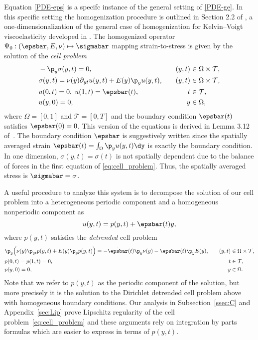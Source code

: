 \documentclass[letterpaper,11pt]{article}
\begin{document}
Equation \eqref{PDE-eps} is a specifc instance of the general setting of \eqref{PDE-ge}. In this specific setting the homogenization procedure is outlined in Section 2.2 of \cite{bhattacharya2023learning}, a one-dimensionalization of the general case of homogenization for Kelvin--Voigt viscoelasticity developed in \cite{francfort1986homogenization}. The homogenized operator $\Psi_0: (\epsbar, E, \nu) \mapsto \sigmabar$ mapping strain-to-stress is given by the solution of the \textit{cell problem}
\begin{subequations}\label{eq:cell_problem}
    \begin{align}
        &-\p_y\sigma(y, t) = 0, &\quad (y,t) &\in \Omega \times \mathcal{T}, \\
         &\sigma(y, t) = \nu(y)\partial_{yt}u(y, t) + E(y)\p_y u(y, t), &\quad (y,t) &\in \Omega \times \mathcal{T}, \label{subeq:map}\\
        &u(0, t) = 0, \; u(1, t) = \epsbar(t), &\; t &\in \mathcal{T}, \\
        &u(y, 0) = 0, &\; y&\in \Omega,
    \end{align}
\end{subequations}
where $\Omega = [0, 1]$ and $\mathcal{T} = [0, T]$ and the boundary condition $\epsbar(t)$ satisfies $\epsbar(0) = 0$. This version of the equations is derived in Lemma 3.12 of~\cite{bhattacharya2023learning}. The boundary condition $\epsbar$ is suggestively written since the spatially averaged strain $\epsbar(t) = \int_{\Omega} \p_y u(y,t) \dy$ is exactly the boundary condition. In one dimension, $\sigma(y,t) = \sigma(t)$ is not spatially dependent due to the balance of forces in the first equation of \eqref{eq:cell_problem}. Thus, the spatially averaged stress is $\sigmabar = \sigma$. 

A useful procedure to analyze this system is to decompose the solution of our cell problem into a heterogeneous periodic component and a homogeneous nonperiodic component as
\begin{equation}\label{eq:periodic_decomp}
    u(y, t) = p(y, t) + \epsbar(t)y,
\end{equation}
where $p(y, t)$ satisfies the \textit{detrended} cell problem
\begin{subequations}\label{eq:detrended_cell_problem}
    \begin{align}
         &\p_y\Big(\nu(y)\p_{yt}p(y, t) + E(y)\p_y p(y, t)\Big) = -\dot{\epsbar}(t)\p_y\nu(y) - \epsbar(t)\p_yE(y), &\quad (y,t) &\in \Omega \times \mathcal{T}, \label{subeq:map}\\
        &p(0, t) = p(1, t) = 0, &\; t &\in \mathcal{T}, \\
        &p(y, 0) = 0, &\; y&\in \Omega.
    \end{align}
\end{subequations}
Note that we refer to $p(y, t)$ as the periodic component of the solution, but more precisely it is the solution to the Dirichlet detrended cell problem above with homogeneous boundary conditions. Our analysis in Subsection~\ref{ssec:C} and Appendix~\ref{sec:Lip} prove Lipschitz regularity of the cell problem~\eqref{eq:cell_problem} and these arguments rely on integration by parts formulas which are easier to express in terms of $p(y, t)$.
\end{document}
